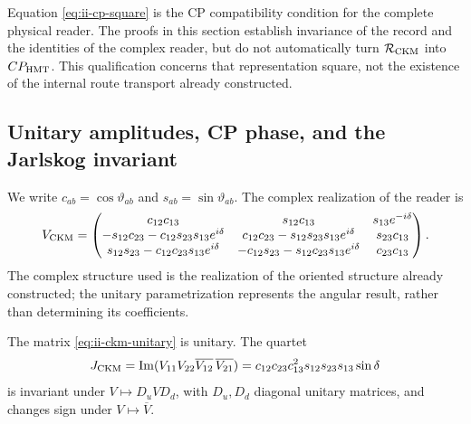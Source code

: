 \begin{remark}
Equation \eqref{eq:ii-cp-square} is the CP compatibility
condition for the complete physical reader.
The proofs in this section establish invariance of the
record and the identities of the complex reader, but do not
automatically turn \(\mathcal R_{\rm CKM}\) into \(CP_{\rm HMT}\).
This qualification concerns that representation square, not the
existence of the internal route transport already constructed.
\end{remark}

\subsection{Unitary amplitudes, CP phase, and the Jarlskog invariant}

We write \(c_{ab}=\cos\vartheta_{ab}\) and
\(s_{ab}=\sin\vartheta_{ab}\). The complex realization of the reader is
\begingroup
\small
\setlength{\arraycolsep}{3pt}
\begin{equation}
 V_{\rm CKM}=
 \begin{pmatrix}
 c_{12}c_{13}&s_{12}c_{13}&s_{13}e^{-i\delta}\\
 -s_{12}c_{23}-c_{12}s_{23}s_{13}e^{i\delta}&
 c_{12}c_{23}-s_{12}s_{23}s_{13}e^{i\delta}&s_{23}c_{13}\\
 s_{12}s_{23}-c_{12}c_{23}s_{13}e^{i\delta}&
 -c_{12}s_{23}-s_{12}c_{23}s_{13}e^{i\delta}&c_{23}c_{13}
 \end{pmatrix}.
 \label{eq:ii-ckm-unitary}
\end{equation}
\endgroup
The complex structure used is the realization of the oriented
structure already constructed; the unitary parametrization represents the angular
result, rather than determining its coefficients.

\begin{proposition}
The matrix \eqref{eq:ii-ckm-unitary} is unitary. The quartet
\begin{equation}
 J_{\rm CKM}
 =\operatorname{Im}
   (V_{11}V_{22}\overline{V_{12}}\,\overline{V_{21}})
 =c_{12}c_{23}c_{13}^2s_{12}s_{23}s_{13}\sin\delta
 \label{eq:ii-jarlskog}
\end{equation}
is invariant under \(V\mapsto D_uVD_d\), with \(D_u,D_d\) diagonal
unitary matrices, and changes sign under \(V\mapsto\overline V\).
\end{proposition}

